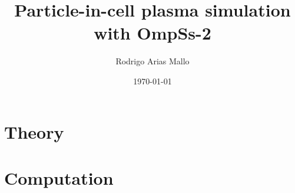 \documentclass[a4paper,12pt]{book}
\title{Particle-in-cell plasma simulation with OmpSs-2}
\author{Rodrigo Arias Mallo}
\date{\today}
\begin{document}
\maketitle


\tableofcontents




\part{Theory}%






\part{Computation}%











%
%




\end{document}
